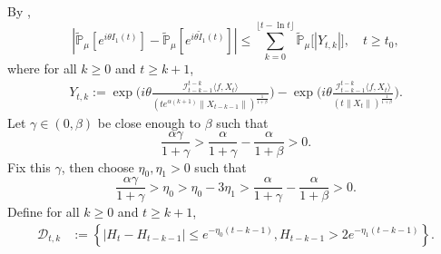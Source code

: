 \documentclass[12pt,a4paper]{amsart}
\theoremstyle{plain}
\theoremstyle{definition}
\numberwithin{equation}{section}
\begin{document}
    By \cite[Lemma 3.4.3]{Durrett2010Probability},
\begin{equation}\label{ineq: control of I1t}
    |\mathbb{\tilde{P}}_{\mu}[e^{i\theta I_1(t)}] - \mathbb{\tilde{P}}_{\mu} [e^{i\theta\tilde{I}_1(t)}]|
    \leq \sum_{k=0}^{\lfloor t-\ln t \rfloor}\mathbb{\tilde{P}}_{\mu}\big[|Y_{t,k}|\big],
    \quad t\geq t_0,
\end{equation}
    where for all $k \geq 0$ and $t\geq k+1$,
\begin{align*}
    Y_{t,k}
    :=\exp\Big(i\theta\frac{\mathcal I_{t-k-1}^{t-k}\langle f ,X_t\rangle}{(t e^{\alpha(k+1)}\|X_{t-k-1}\|)^{\frac{1}{1+\beta}}}\Big)-\exp\Big(i\theta\frac{\mathcal I_{t-k-1}^{t-k}\langle f ,X_t\rangle}{(t\|X_t\|)^{\frac{1}{1+\beta}}}\Big).
\end{align*}
    Let $\gamma \in (0,\beta)$ be close enough to $\beta$ such that
\[
    \frac{\alpha \gamma}{1+\gamma} > \frac{\alpha}{1+\gamma} - \frac{\alpha}{1+\beta} > 0.
\]
    Fix this $\gamma$, then choose $\eta_0,\eta_1>0$ such that
\[
    \frac{\alpha \gamma}{1+\gamma} >\eta_0 > \eta_0 - 3\eta_1 > \frac{\alpha}{1+\gamma} - \frac{\alpha}{1+\beta} > 0.
\]
    Define for all $k \geq 0$ and $t\geq k+1$,
\begin{equation}\begin{split}
\label{def: Dtk}
    \mathcal{D}_{t,k}&:=\left\{|H_t-H_{t-k-1}|\leq  e^{-\eta_0 (t-k-1)}, H_{t-k-1}> 2e^{-\eta_1(t-k-1)}\right\}.
\end{split}\end{equation}
\end{document}
